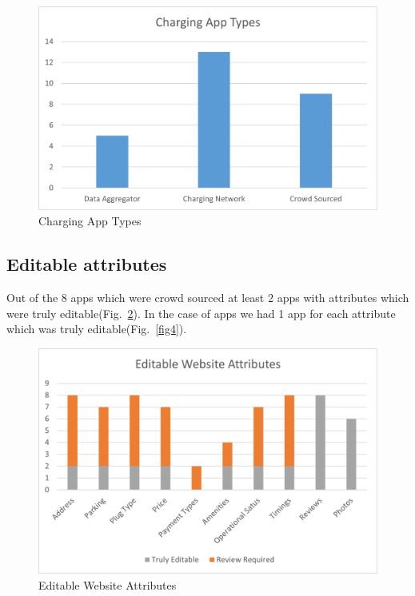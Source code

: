 \documentclass[conference]{IEEEtran}
\begin{document}
\begin{figure}[htbp]
\centerline{\includegraphics[width=\columnwidth]{Picture2.png}}
\caption{Charging App Types}
\label{fig2}
\end{figure}

\subsection{Editable attributes}
Out of the 8 apps which were crowd sourced at least 2 apps with attributes which were truly editable(Fig.~\ref{fig3}). In the case of apps we had 1 app for each attribute which was truly editable(Fig.~\ref{fig4}).

\begin{figure}[htbp]
\centerline{\includegraphics[width=\columnwidth]{Picture3.png}}
\caption{Editable Website Attributes}
\label{fig3}
\end{figure}
\end{document}
